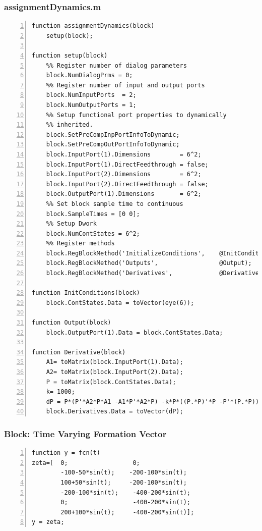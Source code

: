 \documentclass[11pt, a4paper, oneside, openany, reqno]{book}
\theoremstyle{definition}
\theoremstyle{remark}
\numberwithin{equation}{chapter} %
\begin{document}
\subsubsection{assignmentDynamics.m}
\begin{footnotesize}
\begin{Verbatim}[fontfamily=cmtt,baselinestretch=0,numbers=left]
function assignmentDynamics(block)
    setup(block);

function setup(block)
    %% Register number of dialog parameters   
	block.NumDialogPrms = 0;
    %% Register number of input and output ports
    block.NumInputPorts  = 2;
    block.NumOutputPorts = 1;
    %% Setup functional port properties to dynamically
    %% inherited.
    block.SetPreCompInpPortInfoToDynamic;
    block.SetPreCompOutPortInfoToDynamic; 
    block.InputPort(1).Dimensions        = 6^2;
    block.InputPort(1).DirectFeedthrough = false;
    block.InputPort(2).Dimensions        = 6^2;
    block.InputPort(2).DirectFeedthrough = false;
    block.OutputPort(1).Dimensions       = 6^2;  
    %% Set block sample time to continuous
    block.SampleTimes = [0 0];  
    %% Setup Dwork
    block.NumContStates = 6^2;
    %% Register methods
    block.RegBlockMethod('InitializeConditions',    @InitConditions);  
    block.RegBlockMethod('Outputs',                 @Output);  
    block.RegBlockMethod('Derivatives',             @Derivative);  

function InitConditions(block)
    block.ContStates.Data = toVector(eye(6));

function Output(block)
    block.OutputPort(1).Data = block.ContStates.Data;

function Derivative(block)
    A1= toMatrix(block.InputPort(1).Data);
    A2= toMatrix(block.InputPort(2).Data);
    P = toMatrix(block.ContStates.Data);    
    k= 1000;
    dP = P*(P'*A2*P*A1 -A1*P'*A2*P) -k*P*((P.*P)'*P -P'*(P.*P));
    block.Derivatives.Data = toVector(dP);    
\end{Verbatim}
\end{footnotesize}

\subsubsection{Block: Time Varying Formation Vector}
\begin{footnotesize}
\begin{Verbatim}[fontfamily=cmtt,baselinestretch=0,numbers=left]
function y = fcn(t)
zeta=[  0;                  0;
        -100-50*sin(t);    -200-100*sin(t);
        100+50*sin(t);     -200-100*sin(t);
        -200-100*sin(t);    -400-200*sin(t);
        0;                  -400-200*sin(t);
        200+100*sin(t);     -400-200*sin(t)];
y = zeta;
\end{Verbatim}
\end{footnotesize}
	
\end{document}
